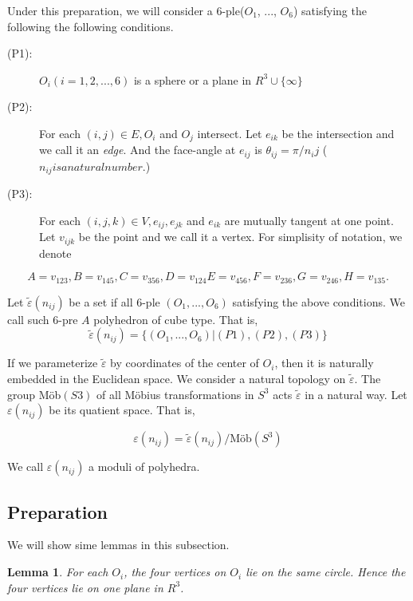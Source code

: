 \documentclass[dvipdfmx]{interact}
\theoremstyle{plain}%
\newtheorem{lemma}[theorem]{Lemma}
\theoremstyle{definition}
\theoremstyle{remark}
\theoremstyle{problemstyle}
\begin{document}
Under this preparation, we will consider a 6-ple($O_1$, ..., $O_6$)
satisfying the following the following conditions.

\begin{description}
 \item[(P1):] $O_i(i = 1, 2, ..., 6)$ is a sphere or a plane in $R^3
            \cup \{\infty\}$
 \item[(P2):] For each $(i, j) \in E, O_i$ and $O_j$ intersect. Let
            $e_{ik}$ be the intersection and we call it an
            \textit{edge}. And the face-angle at $e_{ij}$ is
            $\theta_{ij} = \pi/n_ij$ ($n_{ij} is a natural number.$)
 \item[(P3):] For each $(i, j, k) \in V, e_{ij}, e_{jk}$ and $e_{ik}$
            are mutually tangent at one point. Let $v_{ijk}$ be 
            the point and we call it a vertex. For simplisity of
            notation, we denote
\end{description}
$$
A = v_{123}, B=v_{145}, C = v_{356}, D = v_{124}
E = v_{456}, F=v_{236}, G = v_{246}, H = v_{135}.
$$

Let $\tilde\varepsilon(n_{ij})$ be a set if all 6-ple $(O_1, ..., O_6)$
satisfying the above conditions. We call such 6-pre $A$ polyhedron of
cube type. That is,
$$
\tilde\varepsilon(n_{ij}) = \{(O_1, ..., O_6) | (P1), (P2), (P3)\}
$$

If we parameterize $\tilde\varepsilon$ by coordinates of the center of
$O_i$, then it is naturally embedded in the Euclidean space. We consider
a natural topology on $\tilde\varepsilon$. The group M\"ob$(S3)$ of all
M\"obius transformations in $S^3$ acts $\tilde\varepsilon$ in a natural way.
Let $\varepsilon(n_{ij})$ be its quatient space. That is,

$$
\varepsilon (n_{ij}) = \tilde\varepsilon(n_{ij}) / \text{M\"ob}(S^3)
$$

We call $\varepsilon(n_{ij})$ a moduli of polyhedra.

\subsection{Preparation}

We will show sime lemmas in this subsection.

\begin{lemma}
For each $O_i$, the four vertices on $O_i$ lie on the same circle.
Hence the four vertices lie on one plane in $R^3$.
\end{lemma}
\end{document}

